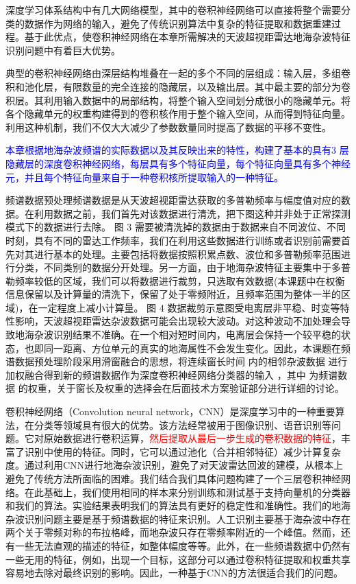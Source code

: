 深度学习体系结构中有几大网络模型，其中的卷积神经网络可以直接将整个需要分类的数据作为网络的输入，避免了传统识别算法中复杂的特征提取和数据重建过程。基于此优点，使卷积神经网络在本章所需解决的天波超视距雷达地海杂波特征识别问题中有着巨大优势。

典型的卷积神经网络由深层结构堆叠在一起的多个不同的层组成：输入层，多组卷积和池化层，有限数量的完全连接的隐藏层，以及输出层。其中最主要的部分为卷积层。其利用输入数据中的局部结构，将整个输入空间划分成很小的隐藏单元。将各个隐藏单元的权重构建得到的卷积核作用于整个输入空间，从而得到特征向量。利用这种机制，我们不仅大大减少了参数数量同时提高了数据的平移不变性。

\textcolor{blue}{本章根据地海杂波频谱的实际数据以及其反映出来的特性，构建了基本的具有3 层隐藏层的深度卷积神经网络，每层具有多个特征向量，每个特征向量具有多个神经元，并且每个特征向量来自于一种卷积核所提取输入的一种特征。
}

频谱数据预处理频谱数据是从天波超视距雷达获取的多普勒频率与幅度值对应的数据。在利用数据之前，我们首先对该数据进行清洗，把下图这种并非处于正常探测模式下的数据进行去除。 图 3 需要被清洗掉的数据由于数据来自不同波位、不同时刻，具有不同的雷达工作频率，我们在利用这些数据进行训练或者识别前需要首先对其进行基本的处理。主要包括将数据按照积累点数、波位和多普勒频率范围进行分类，不同类别的数据分开处理。另一方面，由于地海杂波特征主要集中于多普勒频率较低的区域，我们可以将数据进行裁剪，只选取有效数据(本课题中在权衡信息保留以及计算量的清洗下，保留了处于零频附近，且频率范围为整体一半的区域)，在一定程度上减小计算量。 图 4 数据裁剪示意图受电离层非平稳、时变等特性影响，天波超视距雷达杂波数据可能会出现较大波动。对这种波动不加处理会导致地海杂波识别结果不准确。在一个相对短时间内，电离层会保持一个较平稳的状态，也即同一距离、方位单元的真实的地海属性不会发生变化。因此，本课题在频谱数据预处理阶段采用滑窗融合的思想，将连续窗长时间 内的相邻杂波数据 进行加权融合得到新的频谱数据作为深度卷积神经网络分类器的输入 ，其中 为频谱数据 的权重，关于窗长及权重的选择会在后面技术方案验证部分进行详细的讨论。

卷积神经网络（Convolution neural network，CNN）是深度学习中的一种重要算法，在分类等领域具有很大的优势。该方法经常被用于图像识别、语音识别等问题。它对原始数据进行卷积运算，\textcolor{red}{然后提取从最后一步生成的卷积数据的特征}，丰富了识别中使用的特征。同时，它可以通过池化（合并相邻特征）减少计算复杂度。通过利用CNN进行地海杂波识别，避免了对天波雷达回波的建模，从根本上避免了传统方法所面临的困难。我们结合我们具体问题构建了一个三层卷积神经网络。在此基础上，我们使用相同的样本来分别训练和测试基于支持向量机的分类器和我们的算法。实验结果表明我们的算法具有更好的稳定性和准确性。我们的地海杂波识别问题主要是基于频谱数据的特征来识别。人工识别主要基于海杂波中存在两个关于零频对称的布拉格峰，而地杂波只存在零频率附近的一个峰值。然而，还有一些无法直观的描述的特征，如整体幅度等等。此外，在一些频谱数据中仍然有一些无用的特征，例如，出现一个目标，这部分可以通过卷积特征提取和权重共享容易地去除对最终识别的影响。因此，一种基于CNN的方法很适合我们的问题。


